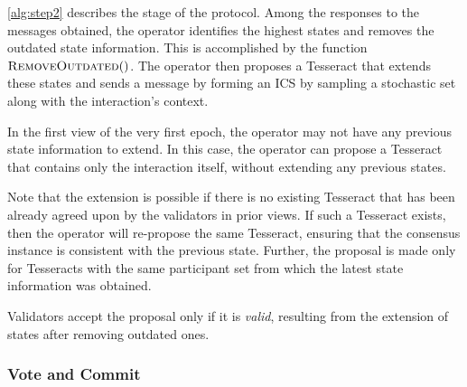\cref{alg:step2} describes the  stage of the protocol. Among the responses to the  messages obtained, the operator identifies the highest states and removes the outdated state information. This is accomplished by the function $\mathrm{\textsc{RemoveOutdated}}()$. The operator then proposes a Tesseract that extends these states and sends a  message by forming an ICS by sampling a stochastic set along with the interaction's context. 

In the first view of the very first epoch, the operator may not have any previous state information to extend. In this case, the operator can propose a Tesseract that contains only the interaction itself, without extending any previous states.

Note that the extension is possible if there is no existing Tesseract that has been already agreed upon by the validators in prior views. If such a Tesseract exists, then the operator will re-propose the same Tesseract, ensuring that the consensus instance is consistent with the previous state. 
Further, the proposal is made only for Tesseracts with the same participant set from which the latest state information was obtained.

Validators accept the proposal only if it is \emph{valid}, resulting from the extension of states after removing outdated ones. %







\subsubsection{Vote and Commit}


